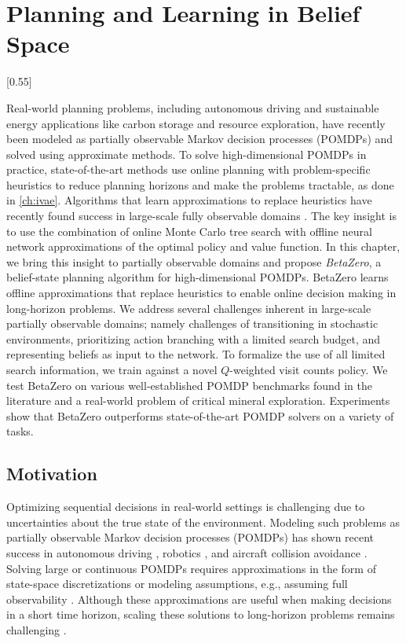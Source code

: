 \chapter{Planning and Learning in Belief Space}\label{ch:betazero}
[0.55\linewidth]

Real-world planning problems, including autonomous driving and sustainable energy applications like carbon storage and resource exploration, have recently been modeled as partially observable Markov decision processes (POMDPs) and solved using approximate methods.
To solve high-dimensional POMDPs in practice, state-of-the-art methods use online planning with problem-specific heuristics to reduce planning horizons and make the problems tractable, as done in \cref{ch:ivae}.
Algorithms that learn approximations to replace heuristics have recently found success in large-scale fully observable domains \cite{silver2018general}.
The key insight is to use the combination of online Monte Carlo tree search with offline neural network approximations of the optimal policy and value function.
In this chapter, we bring this insight to partially observable domains and propose \textit{BetaZero}, a belief-state planning algorithm for high-dimensional POMDPs.
BetaZero learns offline approximations that replace heuristics to enable online decision making in long-horizon problems.
We address several challenges inherent in large-scale partially observable domains; namely challenges of transitioning in stochastic environments, prioritizing action branching with a limited search budget, and representing beliefs as input to the network.
To formalize the use of all limited search information, we train against a novel $Q$-weighted visit counts policy.
We test BetaZero on various well-established POMDP benchmarks found in the literature and a real-world problem of critical mineral exploration.
Experiments show that BetaZero outperforms state-of-the-art POMDP solvers on a variety of tasks.


\section{Motivation}
Optimizing sequential decisions in real-world settings is challenging due to uncertainties about the true state of the environment.
Modeling such problems as partially observable Markov decision processes (POMDPs) has shown recent success in autonomous driving \cite{wray2021pomdps}, robotics \cite{lauri2022partially}, and aircraft collision avoidance \cite{kochenderfer2012next}.
Solving large or continuous POMDPs requires approximations in the form of state-space discretizations or modeling assumptions, e.g., assuming full observability \cite{littman1995learning}.
Although these approximations are useful when making decisions in a short time horizon, scaling these solutions to long-horizon problems remains challenging \cite{shani2013survey}.

